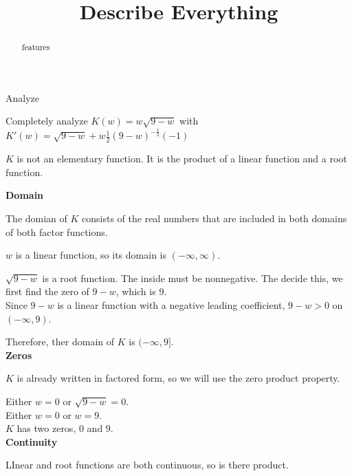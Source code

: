 \documentclass{ximera}
\title{Describe Everything}
\begin{document}
\begin{abstract}
features
\end{abstract}
\maketitle







\begin{example} Analyze


Completely analyze $K(w) = w \sqrt{9-w}$ with   $K'(w) = \sqrt{9 - w} + w \frac{1}{2} (9 - w)^{-\tfrac{1}{2}} (-1)$


$K$ is not an elementary function.  It is the product of a linear function and a root function.


\textbf{Domain}



The domian of $K$ consists of the real numbers that are included in both domains of both factor functions.


$w$ is a linear function, so its domain is $(-\infty, \infty)$.



$\sqrt{9-w}$ is a root function.  The inside must be nonnegative. The decide this, we first find the zero of $9 - w$, which is $9$. \\

Since $9 - w$ is a linear function with a negative leading coefficient, $9 - w > 0$ on $(-\infty, 9)$.

Therefore, ther domain of $K$ is $(-\infty, 9]$. \\




\textbf{Zeros}

$K$ is already written in factored form, so we will use the zero product property.


Either $w = 0$ or $\sqrt{9-w} = 0$. \\

Either $w = 0$ or $w = 9$. \\


$K$ has two zeros, $0$ and $9$. \\




\textbf{Continuity}

LInear and root functions are both continuous, so is there product.







\end{example}
\end{document}
